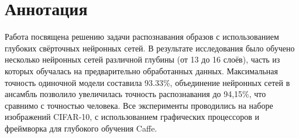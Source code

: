 \section*{Аннотация}
Работа посвящена решению задачи распознавания образов с использованием глубоких свёрточных 
нейронных сетей. В результате исследования было обучено несколько нейронных сетей различной глубины 
(от 13 до 16 слоёв), часть из которых обучалась на предварительно обработанных данных. Максимальная 
точность одиночной модели составила 93.33\%, объединение нейронных сетей в ансамбль позволило
увеличилась точность распознавания до 94,15\%, что сравнимо с точностью человека. Все эксперименты 
проводились на наборе изображений CIFAR-10, с использованием графических процессоров и фреймворка
для глубокого обучения Caffe.